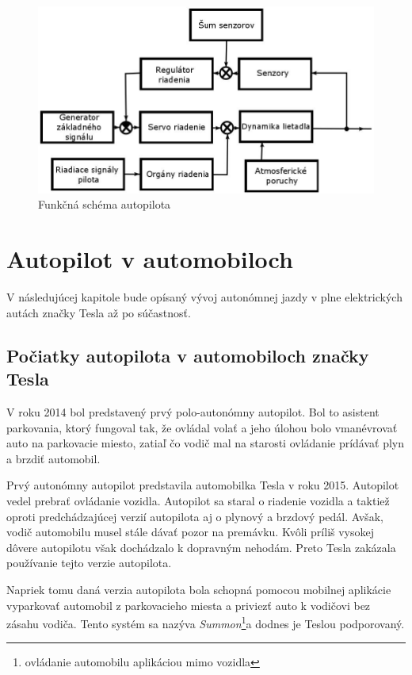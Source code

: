 \documentclass[10pt,twoside,slovak,a4paper]{article}
\begin{document}
\begin{figure}[tbh]
\centering
\includegraphics[scale=0.9]{obr1.jpg}
\caption{Funkčná schéma autopilota}
\label{f:obr1}
\end{figure}

\section{Autopilot v automobiloch}

V následujúcej kapitole bude opísaný vývoj autonómnej jazdy v plne elektrických autách značky Tesla až po súčastnosť.

\subsection{Počiatky autopilota v automobiloch značky Tesla}

V roku 2014 bol predstavený prvý polo-autonómny autopilot. Bol to asistent parkovania, ktorý fungoval tak, že ovládal volať a jeho úlohou bolo vmanévrovať auto na parkovacie miesto, zatiaľ čo vodič mal na starosti ovládanie prídávať plyn a brzdiť automobil. 

Prvý autonómny autopilot predstavila automobilka Tesla v roku 2015. Autopilot vedel prebrať ovládanie vozidla. Autopilot sa staral o riadenie vozidla a taktiež oproti predchádzajúcej verzií autopilota aj o plynový a brzdový pedál. Avšak, vodič automobilu musel stále dávať pozor na premávku. Kvôli príliš vysokej dôvere autopilotu však dochádzalo k dopravným nehodám. Preto Tesla zakázala používanie tejto verzie autopilota.

Napriek tomu daná verzia autopilota bola schopná pomocou mobilnej aplikácie vyparkovať automobil z parkovacieho miesta a priviezť auto k vodičovi bez zásahu vodiča. Tento systém sa nazýva \emph{Summon}\footnote{ovládanie automobilu aplikáciou mimo vozidla}a dodnes je Teslou podporovaný.
\end{document}
